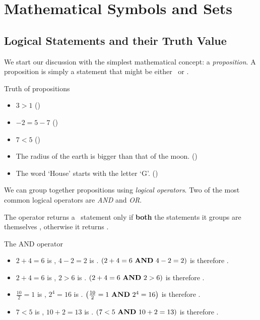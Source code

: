 \section{Mathematical Symbols and Sets}
\subsection{Logical Statements and their Truth Value}
We start our discussion with the simplest mathematical concept: a \emph{proposition}. A proposition is simply a statement that might be either \true\ or \false.
\begin{example}{Truth of propositions}{}
	\begin{itemize}
		\item $3>1$ (\true)
		\item $-2=5-7$ (\true)
		\item $7<5$ (\false)
		\item The radius of the earth is bigger than that of the moon. (\true)
		\item The word `House' starts with the letter `G'. (\false)
	\end{itemize}
\end{example}

We can group together propositions using \emph{logical operators}. Two of the most common logical operators are \emph{AND} and \emph{OR}.

The \AND{} operator returns a \true\ statement only if \textbf{both} the statements it groups are themselves \true, otherwise it returns \false.

\begin{example}{The AND operator}{}
	\begin{itemize}
		\item $2+4=6$ is \true, $4-2=2$ is \true. $\left(2+4=6\ \text{\AND{}}\ 4-2=2\right)$ is therefore \true.
		\item $2+4=6$ is \true, $2>6$ is \false. $\left(2+4=6\ \text{\AND{}}\ 2>6\right)$ is therefore \false.
		\item $\frac{10}{2}=1$ is \false, $2^{4}=16$ is \true. $\left( \frac{10}{2}=1\ \text{\AND{}}\ 2^{4}=16 \right)$ is therefore \false.
		\item $7<5$ is \false, $10+2=13$ is \false. $\left( 7<5\ \text{\textbf{AND}{}}\ 10+2=13 \right)$ is therefore \false.
	\end{itemize}
\end{example}

